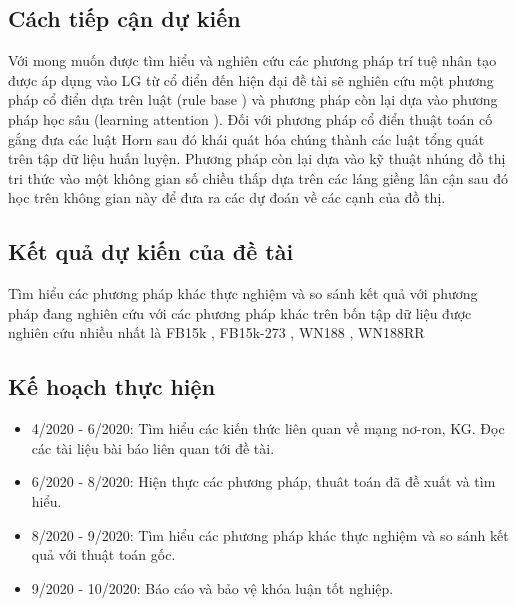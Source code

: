 \documentclass{article}[14pt]
\begin{document}
{    \subsection{Cách tiếp cận dự kiến}
    
    Với mong muốn được tìm hiểu và nghiên cứu các phương pháp trí tuệ nhân tạo được áp dụng vào LG từ cổ điển đến hiện đại đề tài sẽ nghiên cứu một phương pháp cổ điển dựa trên luật (rule base \cite{burl}) và phương pháp còn lại dựa vào phương pháp học sâu (learning attention \cite{gat}). Đối với phương pháp cổ điển thuật toán cố gắng đưa các luật Horn \cite{Hornclause} sau đó khái quát hóa chúng thành các luật tổng quát trên tập dữ liệu huấn luyện. Phương pháp còn lại dựa vào kỹ thuật nhúng \cite{BordesUGWY13} đồ thị tri thức vào một không gian số chiều thấp dựa trên các láng giềng lân cận \cite{gat} sau đó học trên không gian này để đưa ra các dự đoán về các cạnh của đồ thị.
    
    \subsection{Kết quả dự kiến của đề tài}
    Tìm hiểu các phương pháp khác thực nghiệm và so sánh kết quả với phương pháp đang nghiên cứu với các phương pháp khác trên bốn tập dữ liệu được nghiên cứu nhiều nhất là FB15k \cite{toutanova2015observed}, FB15k-273 \cite{toutanova2015observed}, WN188 \cite{BordesUGWY13}, WN188RR \cite{GEmbedding}
    
    \subsection{Kế hoạch thực hiện}
    \begin{itemize}
        \item 4/2020 - 6/2020: Tìm hiểu các kiến thức liên quan về mạng nơ-ron,  KG. Đọc các  tài liệu bài báo liên quan tới đề tài.
        \item 6/2020 - 8/2020: Hiện thực các phương pháp, thuât toán đã đề xuất và tìm hiểu.
        \item 8/2020 - 9/2020: Tìm hiểu các phương pháp khác thực nghiệm và so sánh kết quả với thuật toán gốc.
        \item 9/2020 - 10/2020: Báo cáo và bảo vệ khóa luận tốt nghiệp.
    \end{itemize}
    }
    
    
    \nocite{*}
\end{document}
